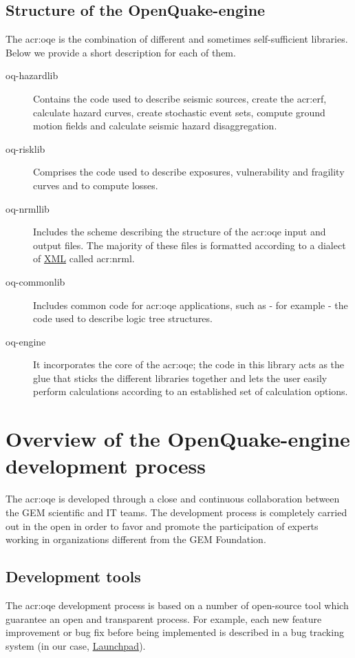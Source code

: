 \subsection{Structure of the OpenQuake-engine}
The \gls{acr:oqe} is the combination of different and sometimes 
self-sufficient libraries. Below we provide a short description for each of
them.
\begin{description}
    \item [oq-hazardlib] Contains the code used to describe 
        seismic sources, create the \gls{acr:erf}, calculate hazard curves, 
        create stochastic event sets, compute ground motion fields and 
        calculate seismic hazard disaggregation.
    \item [oq-risklib] Comprises the code used to describe exposures, 
        vulnerability and fragility curves and to compute losses.
    \item [oq-nrmllib] Includes the scheme describing the structure of 
        the \gls{acr:oqe} input and output files. The majority of these files 
        is formatted according to a dialect of 
        \href{http://www.w3.org/XML/}{XML} called \gls{acr:nrml}. 
    \item [oq-commonlib] Includes common code for \gls{acr:oqe} applications,
        such as - for example - the code used to describe logic tree structures.
    \item [oq-engine] It incorporates the core of the \gls{acr:oqe}; 
        the code in this library acts as the glue that sticks the 
        different libraries together and lets the user easily perform 
        calculations according to an established set of calculation 
        options.
\end{description}
%
\section{Overview of the OpenQuake-engine development process}
%
The \gls{acr:oqe} is developed through a close and continuous collaboration 
between the GEM scientific and IT teams. The development process is completely
carried out in the open in order to favor and promote the
participation of experts working in organizations different from the GEM 
Foundation.
%
\subsection{Development tools}
%
The \gls{acr:oqe} development process is based on a number of open-source
tool which guarantee an open and transparent process. 
%
For example, each new feature improvement or bug fix before being 
implemented is described in a bug tracking system (in our case, 
\href{https://launchpad.net/}{Launchpad}).  

